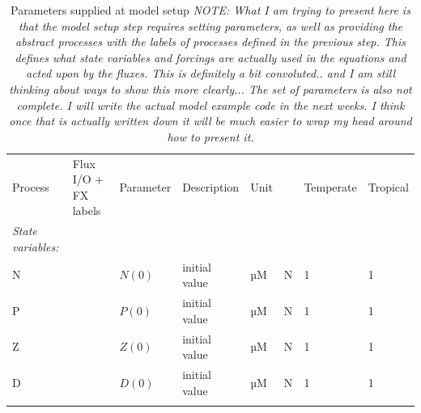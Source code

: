 \documentclass[journal abbreviations, manuscript]{copernicus}
\begin{document}
\begin{table}[t]
\caption{Parameters supplied at model setup \textit{NOTE: What I am trying to present here is that the model setup step requires setting parameters, as well as providing the abstract processes with the labels of processes defined in the previous step. This defines what state variables and forcings are actually used in the equations and acted upon by the fluxes. This is definitely a bit convoluted.. and I am still thinking about ways to show this more clearly... The set of parameters is also not complete. I will write the actual model example code in the next weeks. I think once that is actually written down it will be much easier to wrap my head around how to present it.}}
\begin{tabular}{l l l l l l l}
Process & Flux I/O + FX labels & Parameter & Description & Unit & Temperate & Tropical \\
\tophline

\textit{State variables:} \\
N & & $N(0)$ & initial value & \unit{µM \ N} & 1 & 1 \\
P & & $P(0)$ & initial value & \unit{µM \ N} & 1 & 1 \\
Z & & $Z(0)$ & initial value & \unit{µM \ N} & 1 & 1 \\
D & & $D(0)$ & initial value & \unit{µM \ N} & 1 & 1 \\
\\


\end{tabular}
\end{table}
\end{document}
